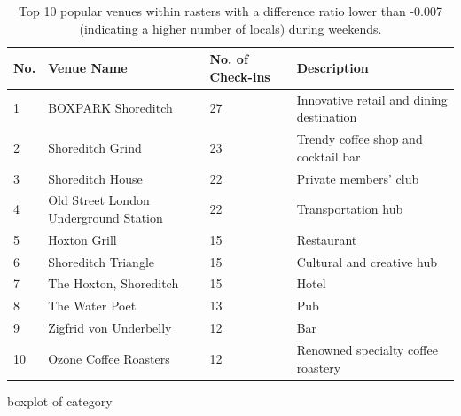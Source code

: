 \documentclass{article}
\begin{document}
\begin{table}[!h]
\centering
\caption{\label{tab:popular_venues_localspop_weekend}Top 10 popular venues within rasters with a difference ratio lower than -0.007 (indicating a higher number of locals) during weekends.}
\begin{adjustbox}{max width=\textwidth, margin=0cm}
\begin{threeparttable}
\begin{tabular}{lp{5cm}lp{4cm}} \hline
No. & Venue Name & No. of Check-ins & Description \\ \hline
1 & BOXPARK Shoreditch & 27 & Innovative retail and dining destination \\
2 & Shoreditch Grind & 23 & Trendy coffee shop and cocktail bar \\
3 & Shoreditch House & 22 & Private members' club \\
4 & Old Street London Underground Station & 22 & Transportation hub \\
5 & Hoxton Grill & 15 & Restaurant \\
6 & Shoreditch Triangle & 15 & Cultural and creative hub \\
7 & The Hoxton, Shoreditch & 15 & Hotel \\
8 & The Water Poet & 13 & Pub \\
9 & Zigfrid von Underbelly & 12 & Bar \\
10 & Ozone Coffee Roasters & 12 & Renowned specialty coffee roastery \\ \hline
\end{tabular}
\end{threeparttable}
\end{adjustbox}
\end{table}



boxplot of category




\end{document}
